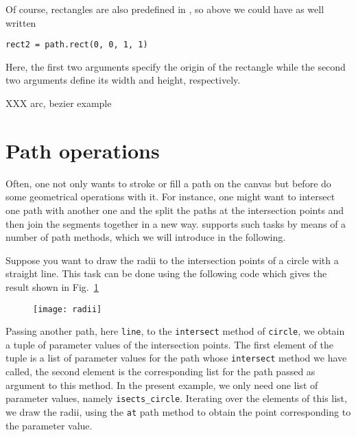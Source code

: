 Of course, rectangles are also predefined in \PyX{}, so above we could
have as well written
\begin{verbatim}
rect2 = path.rect(0, 0, 1, 1)
\end{verbatim}
Here, the first two arguments specify the origin of the rectangle
while the second two arguments define its width and height,
respectively.

XXX arc, bezier example

\section{Path operations}

Often, one not only wants to stroke or fill a path on the canvas
but before do some geometrical operations with it. For instance, one
might want to intersect one path with another one and the split the
paths at the intersection points and then join the segments together
in a new way. \PyX{} supports such tasks by means of a number
of path methods, which we will introduce in the following.

Suppose you want to draw the radii to the intersection points of a
circle with a straight line. This task can be done using the following
code which gives the result shown in Fig.~\ref{fig:radii}

\begin{figure}
\centerline{\texttt{[image: radii]}}
\label{fig:radii}
\end{figure}
Passing another path, here \verb|line|, to the \verb|intersect| method
of \verb|circle|, we obtain a tuple of parameter values of the
intersection points. The first element of the tuple is a list of
parameter values for the path whose \verb|intersect| method we have
called, the second element is the corresponding list for the path
passed as argument to this method. In the present example, we only
need one list of parameter values, namely \verb|isects_circle|.
Iterating over the elements of this list, we draw the radii, using the
\verb|at| path method to obtain the point corresponding to the
parameter value.

